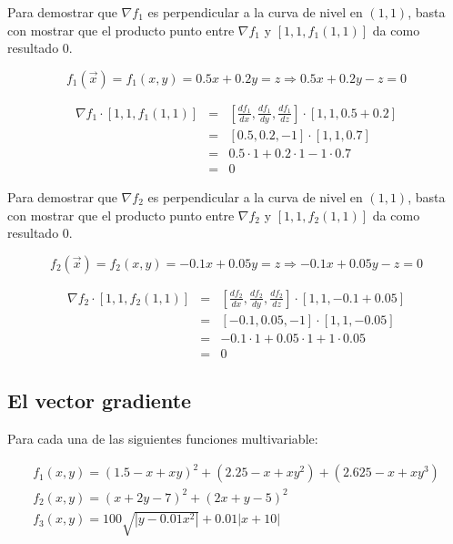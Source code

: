 \documentclass{article}
\begin{document}
\begin{enumerate}
Para demostrar que $\nabla f_1$ es perpendicular a la curva de nivel en $(1,1)$, basta con mostrar que el producto punto entre $\nabla f_1$ y $[1,1,f_1(1,1)]$ da como resultado 0.

\begin{equation}
f_1(\overrightarrow{x})=f_1(x,y)=0.5x+0.2y=z\Rightarrow 0.5x+0.2y-z=0
\end{equation}

\begin{equation}
\begin{array}{rcl}
\nabla f_1\cdot[1,1,f_1(1,1)]&=&\left[\frac{df_1}{dx},\frac{df_1}{dy},\frac{df_1}{dz}\right]\cdot[1,1,0.5+0.2]\\
&=&[0.5,0.2,-1]\cdot[1,1,0.7]\\
&=&0.5\cdot1+0.2\cdot1-1\cdot0.7\\
&=&0
\end{array}
\end{equation}

Para demostrar que $\nabla f_2$ es perpendicular a la curva de nivel en $(1,1)$, basta con mostrar que el producto punto entre $\nabla f_2$ y $[1,1,f_2(1,1)]$ da como resultado 0.

\begin{equation}
f_2(\overrightarrow{x})=f_2(x,y)=-0.1x+0.05y=z\Rightarrow -0.1x+0.05y-z=0
\end{equation}

\begin{equation}
\begin{array}{rcl}
\nabla f_2\cdot[1,1,f_2(1,1)]&=&\left[\frac{df_2}{dx},\frac{df_2}{dy},\frac{df_2}{dz}\right]\cdot[1,1,-0.1+0.05]\\
&=&[-0.1,0.05,-1]\cdot[1,1,-0.05]\\
&=&-0.1\cdot1+0.05\cdot1+1\cdot0.05\\
&=&0
\end{array}
\end{equation}
\end{enumerate}

\subsection{El vector gradiente}

Para cada una de las siguientes funciones multivariable:

\begin{equation}
\begin{array}{l}
f_1(x,y)=(1.5-x+xy)^2+(2.25-x+xy^2)+(2.625-x+xy^3)\\
f_2(x,y)=(x+2y-7)^2+(2x+y-5)^2\\
f_3(x,y)=100\sqrt{|y-0.01x^2|}+0.01|x+10|
\end{array}
\end{equation}
\end{document}
